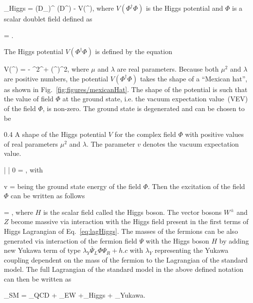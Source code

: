 {
    _{Higgs} =  (D_{\mu}\Phi)^{\dagger} (D^{\mu}\Phi) - V(\Phi^{\dagger}\Phi),
}
where $V(\Phi^{\dagger}\Phi)$ is the Higgs potential and $\Phi$ is a scalar doublet field defined as


{
    \Phi = .
}

The Higgs potential $V(\Phi^{\dagger}\Phi)$ is defined by the equation

{
    V(\Phi^{\dagger}\Phi) =  -  \mu^{2}\Phi^{\dagger}\Phi +  \lambda(\Phi^{\dagger}\Phi)^{2},
}
where $\mu$ and $\lambda$ are real parameters. Because both $\mu^{2}$ and $\lambda$ are positive numbers, the potential $V(\Phi^{\dagger}\Phi)$ takes the shape of a ``Mexican hat'', as shown in Fig.~\ref{fig:figures/mexicanHat}. The shape of the potential is such that the value of field $\Phi$ at the ground state, i.e. the vacuum expectation value~(VEV) of the field $\Phi$, is non-zero. The ground state is degenerated and can be chosen to be

                 {0.4}       %
                 { A shape of the Higgs potential $V$ for the complex field $\Phi$ with positive values of real parameters $\mu^{2}$ and $\lambda$. The parameter $v$ denotes the vacuum expectation value.}

{
     | \Phi | 0 \rangle =  ,
}
with

{
v = 
}
being the ground state energy of the field $\Phi$. Then the excitation of the field $\Phi$ can be written as follows

{
    \Phi = ,
}
where $H$ is the scalar field called the Higgs boson. The vector bosons $W^{\pm}$ and $Z$ become massive via interaction with the Higgs field present in the first terms of Higgs Lagrangian of Eq.~\ref{eq:lagHiggs}. The masses of the fermions can be also generated via interaction of the fermion field  $\Psi$ with the Higgs boson $H$ by adding new Yukawa term of type $\lambda_{Y} \bar{\Psi}_{L} \Phi \Psi_{R} + h.c$ with $\lambda_{Y}$ representing the Yukawa coupling dependent on the mass of the fermion to the Lagrangian of the standard model. The full Lagrangian of the standard model in the above defined notation can then be written as

{
 _{SM} = _{QCD} + _{EW} +_{Higgs} + _{Yukawa}.
} 

